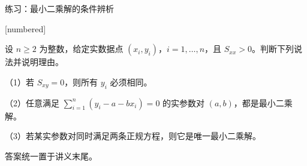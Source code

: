\documentclass[aspectratio=169,10pt,fontset=fandol]{ctexbeamer}
\makeatletter
\newcommand{\mathagentexerciselabelcontext}[1]{%
\hypertarget<1>{#1}{}%
\edef\@currentHref{#1}%
}
\makeatother
\begin{document}
\begin{frame}[t,fragile]{练习：最小二乘解的条件辨析}
\normalsize
{\normalsize
[numbered]
\mathagentexerciselabelcontext{mathagent.exercise.U0029.0}
\begin{exercise}
\label{mathagent:exercise:b4c9c9a1fb82bcef052fdbf6e1539831ed88cee016dbcbf83a50e5e8d2311be0}
设 $n\geq2$ 为整数，给定实数据点 $(x_i,y_i)$，$i=1,\ldots,n$，且 $S_{xx}>0$。判断下列说法并说明理由。

（1）若 $S_{xy}=0$，则所有 $y_i$ 必须相同。

（2）任意满足 $\sum_{i=1}^{n}(y_i-a-bx_i)=0$ 的实参数对 $(a,b)$，都是最小二乘解。

（3）若某实参数对同时满足两条正规方程，则它是唯一最小二乘解。

答案统一置于讲义末尾。
\end{exercise}
}
\end{frame}
\end{document}
